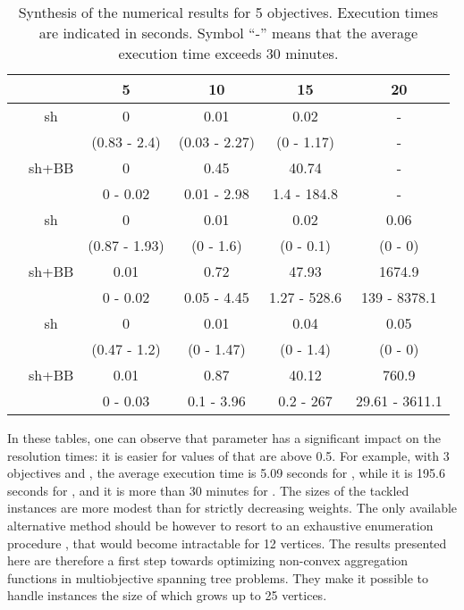 \documentclass[final,3p,times]{elsarticle}
\begin{document}
\begin{table}[!h]
  \begin{center}
  {\small \begin{tabular}{|c|c|cccc|}
    \hline
      \rule[1pt]{0pt}{13pt} 
       & & 5&10&15&20\\
       \hline
     \hline
    & sh&0&0.01&0.02&-\\
          & &(0.83 - 2.4)&(0.03 - 2.27)&(0 - 1.17)& -\\
       \cline{2-6} 
       &sh+BB&0&0.45&40.74&-\\
       &  &0 - 0.02&0.01 - 2.98&1.4 - 184.8& -\\
  \hline
  \hline
   & sh&0&0.01&0.02&0.06\\
  & &(0.87 - 1.93)&(0 - 1.6)&(0 - 0.1)&(0 - 0)\\

    \cline{2-6} 
 &sh+BB&0.01&0.72&47.93&1674.9\\
  &  &0 - 0.02&0.05 - 4.45&1.27 - 528.6&139 - 8378.1\\
  \hline
  \hline
  & sh&0&0.01&0.04&0.05\\
    & &(0.47 - 1.2)&(0 - 1.47)&(0 - 1.4)&(0 - 0)\\
  \cline{2-6} 
  &sh+BB&0.01&0.87&40.12&760.9\\
  &  &0 - 0.03&0.1 - 3.96&0.2 - 267& 29.61 - 3611.1\\
  \hline
    \end{tabular}
}

\end{center}
\caption{\label{tabPL6} Synthesis of the numerical results for 5 objectives. Execution times are
  indicated in seconds. Symbol ``-'' means that the average execution time exceeds 30 minutes.}
\end{table}

In these tables, one can observe that parameter  has a significant impact on the resolution times: it is easier for values of  that are above 0.5. For
example, with 3 objectives and , the
average execution time is 5.09 seconds for , while it
is 195.6 seconds for , and it is more than 30 minutes
for . The sizes of the tackled instances are more modest than for strictly decreasing weights. The only available alternative method should be however to resort to an exhaustive enumeration procedure \cite{KapoR95}, that would become
intractable for 12 vertices. The results presented here are therefore
a first step towards optimizing non-convex aggregation functions in
multiobjective spanning tree problems. They make it possible to handle
instances the size of which grows up to 25 vertices. 
\end{document}
